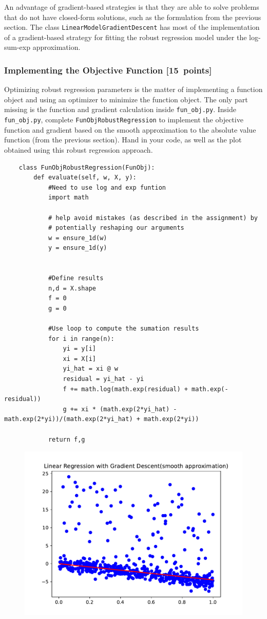 \documentclass{article}
\newcommand{\blu}[1]{{\textcolor{blu}{#1}}}
\let\ask\blu
\newcommand\pts[1]{\textcolor{pointscolour}{[#1~points]}}
\begin{document}
An advantage of gradient-based strategies is that they are able to solve
problems that do not have closed-form solutions, such as the formulation from the
previous section. The class \texttt{LinearModelGradientDescent} has most of the implementation
of a gradient-based strategy for fitting the robust regression model under the log-sum-exp approximation.

\subsubsection{Implementing the Objective Function \pts{15}}

Optimizing robust regression parameters is the matter of implementing a function object and using an optimizer to minimize the function object. The only part missing is the function and gradient calculation inside \texttt{fun\_obj.py}.
\ask{Inside \texttt{fun\_obj.py}, complete \texttt{FunObjRobustRegression} to implement the objective function and gradient based on the smooth
approximation to the absolute value function (from the previous section). Hand in your code, as well
as the plot obtained using this robust regression approach.}
\begin{verbatim}
	class FunObjRobustRegression(FunObj):
		def evaluate(self, w, X, y):
			#Need to use log and exp funtion 
			import math

			# help avoid mistakes (as described in the assignment) by
			# potentially reshaping our arguments
			w = ensure_1d(w)
			y = ensure_1d(y)


			#Define results
			n,d = X.shape
			f = 0
			g = 0

			#Use loop to compute the sumation results
			for i in range(n):
				yi = y[i]
				xi = X[i]
				yi_hat = xi @ w
				residual = yi_hat - yi
				f += math.log(math.exp(residual) + math.exp(-residual))
				g += xi * (math.exp(2*yi_hat) - math.exp(2*yi))/(math.exp(2*yi_hat) + math.exp(2*yi))

			return f,g 
	\end{verbatim}


	\begin{figure}
		\centering
		\includegraphics[width = .7\textwidth]{figs/least_squares_robust.pdf}
	\end{figure}
\end{document}
